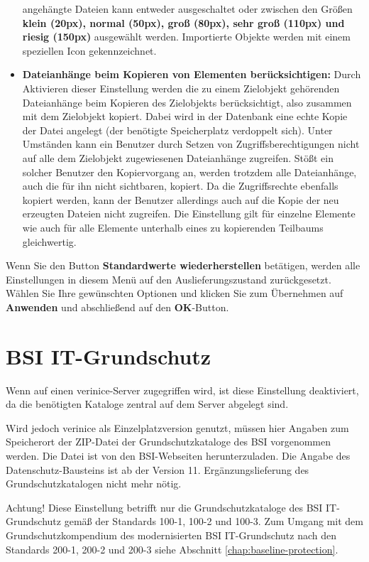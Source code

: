 \documentclass[a4paper,10pt]{book}
\begin{document}
\begin{itemize}
  angehängte Dateien kann entweder ausgeschaltet oder zwischen den
  Größen \textbf{klein (20px), normal (50px), groß (80px), sehr groß
    (110px) und riesig (150px)} ausgewählt werden. Importierte Objekte
  werden mit einem speziellen Icon gekennzeichnet.
\item \textbf{Dateianhänge beim Kopieren von Elementen
berücksichtigen:}
\newline Durch Aktivieren dieser Einstellung werden die zu einem
Zielobjekt gehörenden Dateianhänge beim Kopieren des Zielobjekts
berücksichtigt, also zusammen mit dem Zielobjekt kopiert.
Dabei wird in der Datenbank eine echte Kopie der Datei angelegt (der benötigte
Speicherplatz verdoppelt sich). Unter Umständen kann ein Benutzer durch
Setzen von Zugriffsberechtigungen nicht auf alle dem Zielobjekt
zugewiesenen Dateianhänge zugreifen. Stößt ein solcher Benutzer den
Kopiervorgang an, werden trotzdem alle Dateianhänge, auch die für ihn nicht sichtbaren,
kopiert. Da die Zugriffsrechte ebenfalls kopiert werden, kann der Benutzer
allerdings auch auf die Kopie der neu erzeugten Dateien nicht zugreifen.
Die Einstellung gilt für einzelne Elemente wie auch für alle Elemente unterhalb
eines zu kopierenden Teilbaums gleichwertig.
\end{itemize}

Wenn Sie den Button \textbf{Standardwerte wiederherstellen} betätigen,
werden alle Einstellungen in diesem Menü auf den Auslieferungszustand
zurückgesetzt.
\newline\\
Wählen Sie Ihre gewünschten Optionen und klicken Sie zum Übernehmen
auf \textbf{Anwenden} und abschließend auf den \textbf{OK}-Button.

\section{BSI IT-Grundschutz}
Wenn auf einen verinice-Server zugegriffen wird, ist diese Einstellung
deaktiviert, da die benötigten Kataloge zentral auf dem Server abgelegt sind.

Wird jedoch verinice als Einzelplatzversion genutzt, müssen hier Angaben zum
Speicherort der ZIP-Datei der Grundschutzkataloge des BSI vorgenommen werden.
Die Datei ist von den BSI-Webseiten herunterzuladen. Die Angabe des
Datenschutz-Bausteins ist ab der Version 11. Ergänzungslieferung des
Grundschutzkatalogen nicht mehr nötig.

Achtung! Diese Einstellung betrifft nur die Grundschutzkataloge des BSI
IT-Grundschutz gemäß der Standards 100-1, 100-2 und 100-3. Zum Umgang mit dem
Grundschutzkompendium des modernisierten BSI IT-Grundschutz nach den Standards
200-1, 200-2 und 200-3 siehe Abschnitt \ref{chap:baseline-protection}.
\end{document}
